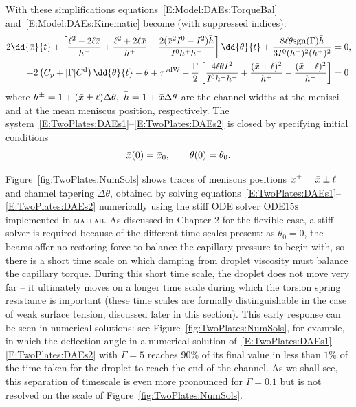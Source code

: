 With these simplifications equations~\eqref{E:Model:DAEs:TorqueBal} and~\eqref{E:Model:DAEs:Kinematic} become (with suppressed indices):
\begin{align}
2\dd{\xbar}{t}+ \left[\frac{\ell^2 - 2\ell \xbar}{h^-} + \frac{\ell^2 + 2\ell \xbar}{h^+}-\frac{2(\xbar^2 I^0 - I^2)\bar{h}}{I^0 h^+ h^-}  \right]\dd{\theta}{t} +\frac{8\ell \theta\sgn (\Gamma)\bar{h}}{3I^0(h^+)^2 (h^+)^2} &= 0, \label{E:TwoPlates:DAEs1}\\
-2\left(C_p+|\Gamma|\viscdamp\right)\dd{\theta}{t}- \theta + \tau^{\text{vdW}} - \frac{\Gamma}{2}\left[\frac{4\ell \theta I^2}{I^0 h^+ h^-} + \frac{(\xbar + \ell)^2}{h^+} - \frac{(\xbar - \ell)^2}{h^-}\right]&=0\label{E:TwoPlates:DAEs2}
\end{align}
where $h^{\pm} = 1 + (\bar{x} \pm \ell)\Delta \theta, ~\bar{h} = 1 + \bar{x}\Delta \theta$ are the channel widths at the menisci and at the mean meniscus position, respectively. The system~\eqref{E:TwoPlates:DAEs1}--\eqref{E:TwoPlates:DAEs2} is closed by specifying initial conditions
\begin{equation}\label{E:TwoPlates:IC}
\bar{x}(0) = \bar{x}_0, \qquad \theta(0) = \theta_0.
\end{equation}

Figure~\ref{fig:TwoPlates:NumSols} shows traces of meniscus positions $x^{\pm} = \bar{x} \pm \ell$ and channel tapering $\Delta \theta$, obtained by solving equations~\eqref{E:TwoPlates:DAEs1}--\eqref{E:TwoPlates:DAEs2} numerically using the stiff ODE solver \textsc{ODE15s} implemented in \textsc{matlab}. As discussed in Chapter 2 for the flexible case, a stiff solver is required because of the different time scales present: as $\theta_0 = 0$, the beams offer no restoring force to balance the capillary pressure to begin with, so there is a short time scale on which damping from droplet viscosity must balance the capillary torque. During this short time scale, the droplet does not move very far -- it ultimately moves on a longer time scale during which the torsion spring resistance is important (these time scales are formally distinguishable in the case of weak surface tension, discussed later in this section). This early response can be seen in numerical solutions: see Figure~\ref{fig:TwoPlates:NumSols}, for example, in which the deflection angle in a numerical solution of~\eqref{E:TwoPlates:DAEs1}--\eqref{E:TwoPlates:DAEs2} with $\Gamma = 5$ reaches 90$\%$ of its final value in less than $1\%$ of the time taken for the droplet to reach the end of the channel. As we shall see, this separation of timescale is even more pronounced for $\Gamma = 0.1$ but is not resolved on the scale of Figure~\ref{fig:TwoPlates:NumSols}.

